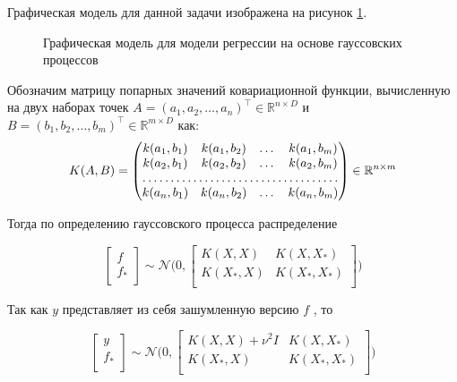 Графическая модель для данной задачи изображена на рисунок \ref{fig:gauss_graph_model}.

\begin{figure}[H]
	\captionsetup{justification=centering}
	\caption{Графическая модель для модели регрессии на основе гауссовских процессов}
	\label{fig:gauss_graph_model}
\end{figure}

Обозначим матрицу попарных значений ковариационной функции, вычисленную на двух наборах точек $A = (a_1, a_2, \dots, a_n)^\top \in \mathbb{R}^{n \times D}$ и $B = (b_1, b_2, \dots, b_m)^\top \in \mathbb{R}^{m \times D}$ как:
$$
  K(A, B) =
 \begin{pmatrix}
 k(a_1, b_1)       & k(a_1, b_2) &  \dots & k(a_1, b_m) \\
 k(a_2, b_1)       & k(a_2, b_2) &  \dots & k(a_2, b_m) \\
 \hdotsfor{4} \\
 k(a_n, b_1)       & k(a_n, b_2) &  \dots & k(a_n, b_m)
 \end{pmatrix}
 \in \mathbb{R}^{n \times m}
$$

Тогда по определению гауссовского процесса распределение

$$
\begin{bmatrix}
f      \\
f_*     \\
\end{bmatrix}
\sim
\mathcal{N} 
\Bigg (0, 
\begin{bmatrix}
K(X,  X) & K(X, X_*) \\
K(X_*,  X) & K(X_*, X_*) \\
\end{bmatrix}
\Bigg )
$$

Так как $y$ представляет из себя зашумленную версию $f$ , то

$$
\begin{bmatrix}
y      \\
f_*     \\
\end{bmatrix}
\sim
\mathcal{N} 
\Bigg (0, 
\begin{bmatrix}
K(X,  X) + \nu^2 I & K(X, X_*) \\
K(X_*,  X) & K(X_*, X_*) \\
\end{bmatrix}
\Bigg )
$$

